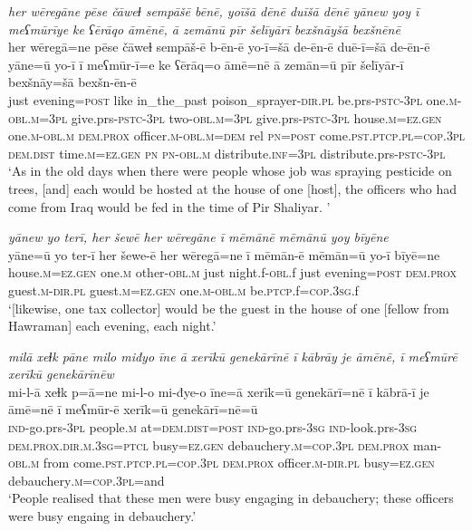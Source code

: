 \ea \label{BP.40}
\textit{her wēregāne pēse čāweɫ sempāšē bēnē, yoīšā dēnē duīšā dēnē yānew yoy ī meʕmūrīye ke ʕērāqo āmēnē, ā zemānū pīr šelīyārī bexšnāyšā bexšnēnē} \\ 
\gll her wēregā=ne pēse čāweɫ sempāš-ē b-ēn-ē yo-ī=šā de-ēn-ē duē-ī=šā de-ēn-ē yāne=ū yo-ī ī meʕmūr-ī=e ke ʕērāq=o āmē=nē ā zemān=ū pīr šelīyār-ī bexšnāy=šā bexšn-ēn-ē \\ 
 just evening\textsc{=\textsc{post}} like in\_the\_past poison\_sprayer\textsc{-dir}\textsc{.pl} be.prs\textsc{-pstc}\textsc{-3pl} one\textsc{.m}\textsc{-obl}\textsc{.m}\textsc{=3pl} give.prs\textsc{-pstc}\textsc{-3pl} two\textsc{-obl}\textsc{.m}\textsc{=3pl} give.prs\textsc{-pstc}\textsc{-3pl} house\textsc{.m}\textsc{=ez.gen} one\textsc{.m}\textsc{-obl}\textsc{.m} \textsc{dem.prox} officer\textsc{.m}\textsc{-obl}\textsc{.m}\textsc{=dem} rel \textsc{pn}\textsc{=\textsc{post}} come\textsc{.pst}\textsc{.ptcp}\textsc{.pl}\textsc{=cop}\textsc{.3pl} \textsc{dem.dist} time\textsc{.m}\textsc{=ez.gen} \textsc{pn} \textsc{pn}\textsc{-obl}\textsc{.m} distribute\textsc{.inf}\textsc{=3pl} distribute.prs\textsc{-pstc}\textsc{-3pl} \\ 
\glt `As in the old days when there were people whose job was spraying pesticide on trees, [and] each would be hosted at the house of one [host], the officers who had come from Iraq would be fed in the time of Pir Shaliyar. '
\z 
 
\ea \label{BP.43}
\textit{yānew yo terī, her šewē her wēregāne ī mēmānē mēmānū yoy bīyēne} \\ 
\gll yāne=ū yo ter-ī her šewe-ē her wēregā=ne ī mēmān-ē mēmān=ū yo-ī bīyē=ne \\ 
 house\textsc{.m}\textsc{=ez.gen} one\textsc{.m} other\textsc{-obl}\textsc{.m} just night.f\textsc{-obl}.f just evening\textsc{=\textsc{post}} \textsc{dem.prox} guest\textsc{.m}\textsc{-dir}\textsc{.pl} guest\textsc{.m}\textsc{=ez.gen} one\textsc{.m}\textsc{-obl}\textsc{.m} be\textsc{.ptcp}.f\textsc{=cop}\textsc{.3sg}.f \\ 
\glt `[likewise, one tax collector] would be the guest in the house of one [fellow from Hawraman]  each evening, each night.'
\z 
 
\ea \label{BP.45}
\textit{milā xeɫk pāne milo miđyo īne ā xerīkū genekārīnē ī kābrāy je āmēnē, ī meʕmūrē xerīkū genekārīnēw} \\ 
\gll mi-l-ā xeɫk p=ā=ne mi-l-o mi-đye-o īne=ā xerīk=ū genekārī=nē ī kābrā-ī je āmē=nē ī meʕmūr-ē xerīk=ū genekārī=nē=ū \\ 
 \textsc{ind-}go.prs\textsc{-3pl} people\textsc{.m} at=\textsc{dem.dist}\textsc{=\textsc{post}} \textsc{ind-}go.prs\textsc{-3sg} \textsc{ind-}look.prs\textsc{-3sg} \textsc{dem.prox}\textsc{.dir}\textsc{.m}\textsc{.3sg}=\textsc{ptcl} busy\textsc{=ez.gen} debauchery\textsc{.m}\textsc{=cop}\textsc{.3pl} \textsc{dem.prox} man\textsc{-obl}\textsc{.m} from come\textsc{.pst}\textsc{.ptcp}\textsc{.pl}\textsc{=cop}\textsc{.3pl} \textsc{dem.prox} officer\textsc{.m}\textsc{-dir}\textsc{.pl} busy\textsc{=ez.gen} debauchery\textsc{.m}\textsc{=cop}\textsc{.3pl}=and \\ 
\glt `People realised that these men were busy engaging in debauchery; these officers were busy engaing in debauchery.'
\z 
 
